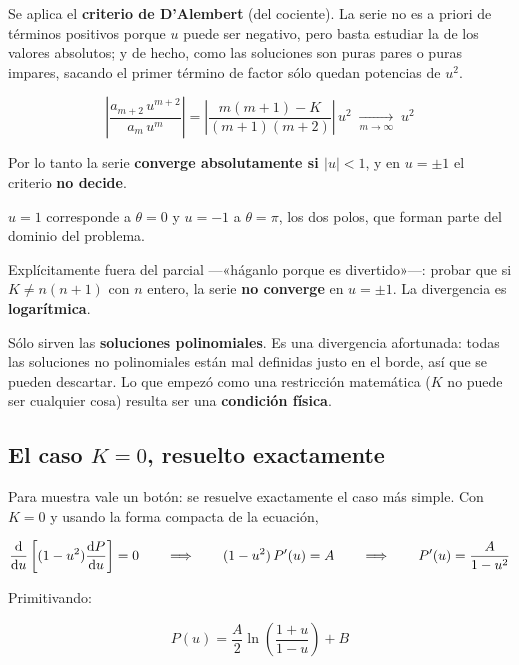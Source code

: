 \documentclass[12pt,a4paper]{article}
\begin{document}
Se aplica el \textbf{criterio de D'Alembert} (del cociente). La serie no es a
priori de términos positivos porque $u$ puede ser negativo, pero basta estudiar la
de los valores absolutos; y de hecho, como las soluciones son puras pares o puras
impares, sacando el primer término de factor sólo quedan potencias de $u^2$.

\[
\left|\frac{a_{m+2}\,u^{m+2}}{a_m\,u^{m}}\right|
= \left|\frac{m(m+1)-K}{(m+1)(m+2)}\right|\,u^{2}
\;\xrightarrow[m\to\infty]{}\; u^{2}
\]

Por lo tanto la serie \textbf{converge absolutamente si $|u| < 1$}, y en
$u = \pm1$ el criterio \textbf{no decide}.

\begin{warnbox}[Y $u=\pm1$ es justamente donde hace falta]
$u=1$ corresponde a $\theta = 0$ y $u=-1$ a $\theta = \pi$, los dos polos, que
forman parte del dominio del problema.
\end{warnbox}

\begin{notebox}
Explícitamente fuera del parcial ---«háganlo porque es divertido»---: probar que si
$K \neq n(n+1)$ con $n$ entero, la serie \textbf{no converge} en $u = \pm 1$. La
divergencia es \textbf{logarítmica}.
\end{notebox}

\begin{keybox}[Conclusión]
Sólo sirven las \textbf{soluciones polinomiales}. Es una divergencia afortunada:
todas las soluciones no polinomiales están mal definidas justo en el borde, así
que se pueden descartar. Lo que empezó como una restricción matemática ($K$ no
puede ser cualquier cosa) resulta ser una \textbf{condición física}.
\end{keybox}

\subsection{El caso \texorpdfstring{$K=0$}{K=0}, resuelto exactamente}

Para muestra vale un botón: se resuelve exactamente el caso más simple. Con $K=0$
y usando la forma compacta de la ecuación,

\[
\dv{u}\left[(1-u^2)\dv{P}{u}\right] = 0
\qquad\Longrightarrow\qquad
(1-u^2)\,P'(u) = A
\qquad\Longrightarrow\qquad
P'(u) = \frac{A}{1-u^2}
\]

Primitivando:

\[
\boxed{\;P(u) = \frac{A}{2}\ln\!\left(\frac{1+u}{1-u}\right) + B\;}
\]
\end{document}
